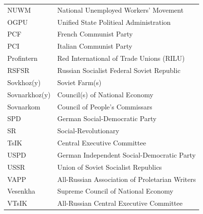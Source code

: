\begin{longtable}{@{}p{3.5cm} p{10cm}@{}}
NUWM & National Unemployed Workers' Movement \\
OGPU & Unified State Politieal Administration \\ %
PCF & French Communist Party \\
PCI & Italian Communist Party \\
Profintern & Red International of Trade Unions (RILU) \\
RSFSR & Russian Socialist Federal Soviet Republic \\
Sovkhoz(y) & Soviet Farm(s) \\
Sovnarkhoz(y) & Council(s) of National Economy \\
Sovnarkom & Council of People's Commissars \\
SPD & German Social-Democratic Party \\
SR & Social-Revolutionary \\
TsIK & Central Executive Committee \\
USPD & German Independent Social-Democratic Party \\
USSR & Union of Soviet Socialist Republics \\
VAPP & All-Russian Association of Proletarian Writers \\
Vesenkha & Supreme Council of National Economy \\
VTsIK & All-Russian Central Executive Committee \\
\end{longtable}